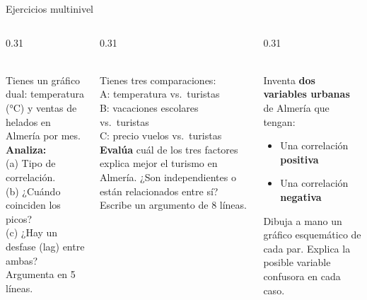 \documentclass[aspectratio=169, 10pt, spanish]{beamer}
\begin{document}

\begin{frame}{Ejercicios multinivel}
  \begin{columns}[T]
    \begin{column}{0.31\textwidth}
      \begin{analizarbox}
        \AlmFontFootnote{}\\[4pt]
        Tienes un gráfico dual: temperatura (°C)
        y ventas de helados en Almería por mes.\\[4pt]
        \textbf{Analiza:}\\
        (a) Tipo de correlación.\\
        (b) ¿Cuándo coinciden los picos?\\
        (c) ¿Hay un desfase (lag) entre ambas?\\
        Argumenta en 5 líneas.
      \end{analizarbox}
    \end{column}
    \begin{column}{0.31\textwidth}
      \begin{evaluarbox}
        \AlmFontFootnote{}\\[4pt]
        Tienes tres comparaciones:\\[3pt]
        A: temperatura vs.\ turistas\\
        B: vacaciones escolares vs.\ turistas\\
        C: precio vuelos vs.\ turistas\\[4pt]
        \textbf{Evalúa} cuál de los tres factores
        explica mejor el turismo en Almería.
        ¿Son independientes o están relacionados
        entre sí? Escribe un argumento de 8 líneas.
      \end{evaluarbox}
    \end{column}
    \begin{column}{0.31\textwidth}
      \begin{crearbox}
        \AlmFontFootnote{}\\[4pt]
        Inventa \textbf{dos variables urbanas}
        de Almería que tengan:
        \begin{itemize}
          \item Una correlación \textbf{positiva}
          \item Una correlación \textbf{negativa}
        \end{itemize}
        Dibuja a mano un gráfico esquemático
        de cada par. Explica la posible variable
        confusora en cada caso.
      \end{crearbox}
    \end{column}
  \end{columns}
\end{frame}
\end{document}
